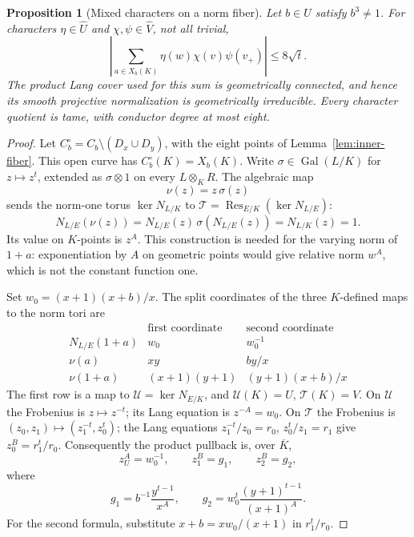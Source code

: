 \documentclass[11pt]{article}
\newtheorem{proposition}[theorem]{Proposition}
\begin{document}
\begin{proposition}[Mixed characters on a norm fiber]
\label{prop:inner-mixed-character}
Let $b\in U$ satisfy $b^3\ne1$. For characters
$\eta\in\widehat U$ and $\chi,\psi\in\widehat V$, not all trivial,
\begin{equation}\label{eq:inner-mixed-bound}
 \left|\sum_{a\in X_b(K)}\eta(w)\chi(v)\psi(v_+)\right|
 \le8\sqrt t.
\end{equation}
The product Lang cover used for this sum is geometrically connected,
and hence its smooth projective normalization is geometrically irreducible.
Every character quotient is tame, with conductor degree at most eight.
\end{proposition}
\begin{proof}
Let $C_b^\circ=C_b\setminus(D_x\cup D_y)$, with the eight points of
Lemma~\ref{lem:inner-fiber}. This open curve has
$C_b^\circ(K)=X_b(K)$. Write $\sigma\in\operatorname{Gal}(L/K)$
for $z\mapsto z^t$, extended as $\sigma\otimes1$ on every
$L\otimes_K R$. The algebraic map
\[
 \nu(z)=z\,\sigma(z)
\]
sends the norm-one torus $\ker N_{L/K}$ to
$\mathcal T=\operatorname{Res}_{E/K}(\ker N_{L/E})$:
\[
 N_{L/E}(\nu(z))=N_{L/E}(z)\,\sigma(N_{L/E}(z))=N_{L/K}(z)=1.
\]
Its value on $K$-points is $z^A$. This construction is needed for
the varying norm of $1+a$: exponentiation by $A$ on geometric
points would give relative norm $w^A$, which is not the constant
function one.

Set $w_0=(x+1)(x+b)/x$. The split coordinates of the three
$K$-defined maps to the norm tori are
\[
\begin{array}{c|cc}
 &\text{first coordinate}&\text{second coordinate}\\\hline
 N_{L/E}(1+a)&w_0&w_0^{-1}\\
 \nu(a)&xy&by/x\\
 \nu(1+a)&(x+1)(y+1)&(y+1)(x+b)/x
\end{array}
\]
The first row is a map to $\mathcal U=\ker N_{E/K}$, and
$\mathcal U(K)=U$, $\mathcal T(K)=V$.
On $\mathcal U$ the Frobenius is $z\mapsto z^{-t}$; its Lang
equation is $z^{-A}=w_0$. On $\mathcal T$ the Frobenius is
$(z_0,z_1)\mapsto(z_1^{-t},z_0^t)$; the Lang equations
$z_1^{-t}/z_0=r_0$, $z_0^t/z_1=r_1$ give
$z_0^B=r_1^t/r_0$.
Consequently the product pullback is, over $\overline K$,
\begin{equation}\label{eq:inner-mixed-cover}
 z_U^A=w_0^{-1},\qquad z_1^B=g_1,\qquad z_2^B=g_2,
\end{equation}
where
\begin{equation}\label{eq:inner-mixed-functions}
 g_1=b^{-1}\frac{y^{t-1}}{x^A},\qquad
 g_2=w_0^t\frac{(y+1)^{t-1}}{(x+1)^A}.
\end{equation}
For the second formula, substitute
$x+b=xw_0/(x+1)$ in $r_1^t/r_0$.


\end{proof}
\end{document}

